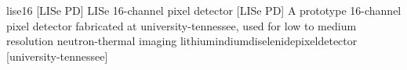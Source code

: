 \newglsXequipment%
{lise16}%
[LISe PD]%
{LISe 16-channel pixel detector}%
[LISe PD]%
{A prototype 16{\--}channel pixel detector fabricated at \gls{university-tennessee}, used for low to medium resolution \gls{neutron-thermal} imaging}%
{lithiumindiumdiselenidepixeldetector}%
[university-tennessee]%